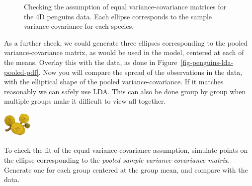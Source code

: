 \documentclass[
  letterpaper,
]{krantz}
\newcommand{\infobox}[1]{%
\noindent\colorbox{info!30}{%
\begin{minipage}{0.98\linewidth}%
    \centering%
    \begin{minipage}[c]{0.15\linewidth} %
      \includegraphics[width=1.5cm]{images/mulga-flowers2.png} %
    \end{minipage}%
    \hfill %
    \begin{minipage}[c]{0.8\linewidth} %
      \bigskip%
      \textsf{#1}%
      \bigskip%
    \end{minipage}%
    \hspace*{3mm}%
  \end{minipage}%
}%
}
\begin{document}
\begin{figure}
\begin{minipage}[t]{0.50\linewidth}
{{}

}

\end{minipage}%

\caption{\label{fig-penguins-lda-ellipses-pdf}Checking the assumption of
equal variance-covariance matrices for the 4D penguins data. Each
ellipse corresponds to the sample variance-covariance for each species.}

\end{figure}

As a further check, we could generate three ellipses corresponding to
the pooled variance-covariance matrix, as would be used in the model,
centered at each of the means. Overlay this with the data, as done in
Figure~\ref{fig-penguins-lda-pooled-pdf}. Now you will compare the
spread of the observations in the data, with the elliptical shape of the
pooled variance-covariance. If it matches reasonably we can safely use
LDA. This can also be done group by group when multiple groups make it
difficult to view all together.

\infobox{To check the fit of the equal variance-covariance assumption, simulate points on the ellipse corresponding to the \emph{pooled sample variance-covariance matrix}. Generate one for each group centered at the group mean, and compare with the data.}

\end{document}
